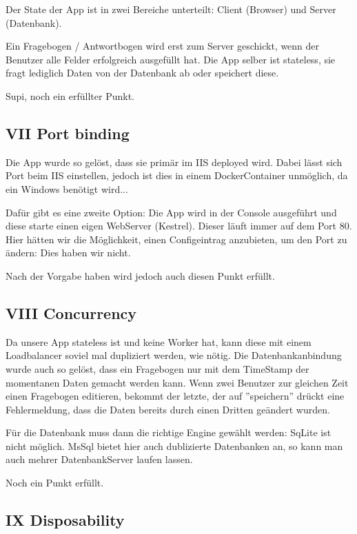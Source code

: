 \documentclass[11pt,titlepage]{article}
\begin{document}
Der State der App ist in zwei Bereiche unterteilt: Client (Browser) und Server (Datenbank).

Ein Fragebogen / Antwortbogen wird erst zum Server geschickt, wenn der Benutzer alle Felder erfolgreich ausgefüllt hat.
Die App selber ist stateless, sie fragt lediglich Daten von der Datenbank ab oder speichert diese.
\par\medskip
Supi, noch ein erfüllter Punkt.

\subsection{VII Port binding}
\label{sec:twelvePort}

Die App wurde so gelöst, dass sie primär im IIS deployed wird. Dabei lässt sich Port beim IIS einstellen, jedoch ist dies in einem DockerContainer unmöglich, da ein Windows benötigt wird...
\par\medskip
Dafür gibt es eine zweite Option: Die App wird in der Console ausgeführt und diese starte einen eigen WebServer (Kestrel).
Dieser läuft immer auf dem Port 80. Hier hätten wir die Möglichkeit, einen Configeintrag anzubieten, um den Port zu ändern: Dies haben wir nicht.
\par\medskip
Nach der Vorgabe haben wird jedoch auch diesen Punkt erfüllt.

\subsection{VIII Concurrency}
\label{sec:twelveConcurrency}

Da unsere App stateless ist und keine Worker hat, kann diese mit einem Loadbalancer soviel mal dupliziert werden, wie nötig.
Die Datenbankanbindung wurde auch so gelöst, dass ein Fragebogen nur mit dem TimeStamp der momentanen Daten gemacht werden kann. Wenn zwei Benutzer zur gleichen Zeit einen Fragebogen editieren, bekommt der letzte, der auf ''speichern'' drückt eine Fehlermeldung, dass die Daten bereits durch einen Dritten geändert wurden.
\par\medskip
Für die Datenbank muss dann die richtige Engine gewählt werden: SqLite ist nicht möglich. MsSql bietet hier auch dublizierte Datenbanken an, so kann man auch mehrer DatenbankServer laufen lassen.
\par\medskip
Noch ein Punkt erfüllt.

\subsection{IX Disposability}
\label{sec:twelveDisposability}
\end{document}
